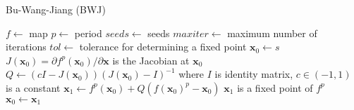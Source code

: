 \begin{algorithm}[!h]
    \caption{Bu-Wang-Jiang (BWJ)}
    \label{alg:bwj}
    \begin{algorithmic}[1]
        \Statex $f \gets$ map
        \Statex $p \gets$ period
        \Statex $seeds \gets$ seeds
        \Statex $maxiter \gets$ maximum number of iterations
        \Statex $tol \gets$ tolerance for determining a fixed point
            \State $\textbf{x}_{0} \gets s$
                \State $J(\textbf{x}_{0}) = \partial f^{p}(\textbf{x}_{0}) / \partial \textbf{x}$ is the Jacobian at $\textbf{x}_{0}$
                \State $Q \gets (cI-J(\textbf{x}_{0}))(J(\textbf{x}_{0})-I)^{-1}$ where $I$ is identity matrix, $c \in (-1, 1)$ is a constant 
                \State $\textbf{x}_1 \gets f^{p}(\textbf{x}_{0}) + Q(f(\textbf{x}_{0})^{p}-\textbf{x}_{0})$
                    \State $\textbf{x}_{1}$ is a fixed point of $f^{p}$
                \EndIf
                \State $\textbf{x}_{0} \gets \textbf{x}_{1}$
            \EndWhile
        \EndFor
    \end{algorithmic}
\end{algorithm}

